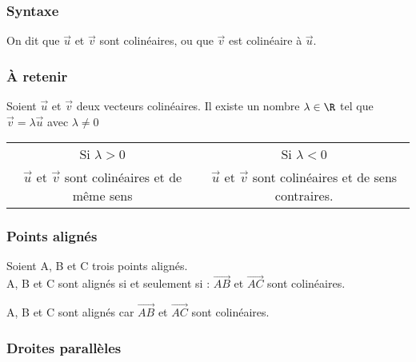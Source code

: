 \subsubsection{Syntaxe}

On dit que $\overrightarrow{u}$ et $\overrightarrow{v}$ sont colinéaires, ou que $\overrightarrow{v}$ est colinéaire à  $\overrightarrow{u}$. 

\subsubsection{À retenir}

Soient $\overrightarrow{u}$ et $ \overrightarrow{v} $ deux vecteurs 
colinéaires. Il existe un nombre $\lambda \in \R $ tel que $ \overrightarrow{v} = \lambda \overrightarrow{u} $ avec $ \lambda \neq 0$ \\

\begin{tabular}{c|c}

Si $\lambda > 0 $ & Si $\lambda < 0$ \\
$\overrightarrow{u}$ et $\overrightarrow{v}$ sont colinéaires et de même sens & $\overrightarrow{u}$ et $\overrightarrow{v}$ sont colinéaires et de sens contraires.

\end{tabular}

\subsubsection{Points alignés}

Soient A, B et C trois points alignés.\\

A, B et C sont alignés si et seulement si : $ \overrightarrow{AB}$ et $\overrightarrow{AC}$ sont colinéaires.


A, B et C sont alignés car $\overrightarrow{AB}$ et $\overrightarrow{AC}$ sont colinéaires.

\subsubsection{Droites parallèles}

